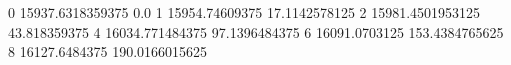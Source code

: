 0 15937.6318359375 0.0
1 15954.74609375 17.1142578125
2 15981.4501953125 43.818359375
4 16034.771484375 97.1396484375
6 16091.0703125 153.4384765625
8 16127.6484375 190.0166015625
